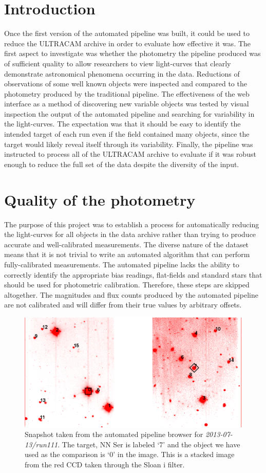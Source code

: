 \section{Introduction}
Once the first version of the automated pipeline was built, it could be used to reduce the ULTRACAM archive in order to evaluate how effective it was. The first aspect to investigate was whether the photometry the pipeline produced was of sufficient quality to allow researchers to view light-curves that clearly demonstrate astronomical phenomena occurring in the data. Reductions of observations of some well known objects were inspected and compared to the photometry produced by the traditional pipeline. The effectiveness of the web interface as a method of discovering new variable objects was tested by visual inspection the output of the automated pipeline and searching for variability in the light-curves. The expectation was that it should be easy to identify the intended target of each run even if the field contained many objects, since the target would likely reveal itself through its variability. Finally, the pipeline was instructed to process all of the ULTRACAM archive to evaluate if it was robust enough to reduce the full set of the data despite the diversity of the input. 

\section{Quality of the photometry}
The purpose of this project was to establish a process for automatically reducing the light-curves for all objects in the data archive rather than trying to produce accurate and well-calibrated measurements. The diverse nature of the dataset means that it is not trivial to write an automated algorithm that can perform fully-calibrated measurements. The automated pipeline lacks the ability to correctly identify the appropriate bias readings, flat-fields and standard stars that should be used for photometric calibration. Therefore, these steps are skipped altogether. The magnitudes and flux counts produced by the automated pipeline are not calibrated and will differ from their true values by arbitrary offsets. 

\begin{figure}
\centering
\includegraphics[width=120mm]{images/2013-07-13-run111-r-withlabels.png}
\caption{Snapshot taken from the automated pipeline browser for \emph{2013-07-13/run111}. The target, {NN Ser} is labeled `7' and the object we have used as the comparison is  `0' in the image. This is a stacked image from the red CCD taken through the Sloan i filter. }
\label{fig:nnserfield}
\end{figure}

